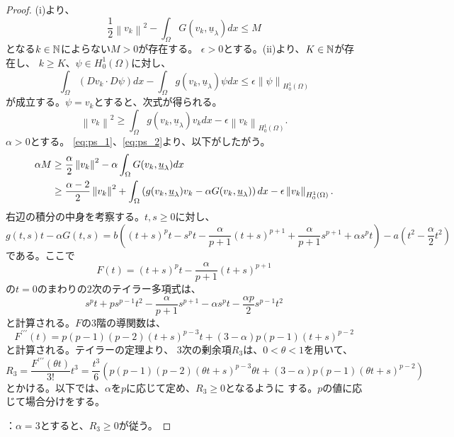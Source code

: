 \begin{proof}
 (i)より、
 \begin{equation}
  \frac{1}{2} \left\| v_k \right\|^2 - \int_\Omega G(v_k,
   \underline{u}_\lambda )dx \leq M \label{eq:ps_1}
 \end{equation}
 となる$k \in \mathbb{N}$によらない$M > 0$が存在する。
 $\epsilon > 0$とする。(ii)より、$K \in \mathbb{N}$が存在し、
 $k \geq K$、$\psi \in H_0^1(\Omega)$に対し、
 \[
  \int_\Omega (D v_k \cdot D \psi) dx - \int_\Omega g(v_k,
 \underline{u}_\lambda)\psi dx \leq \epsilon \left\| \psi
 \right\|_{H_0^1(\Omega) }
 \]
 が成立する。$\psi = v_k$とすると、次式が得られる。
 \begin{equation}
  \left\| v_k \right\|^2 \geq \int_\Omega g(v_k,
   \underline{u}_\lambda)v_k dx - \epsilon \left\| v_k
   \right\|_{H_0^1(\Omega)}. \label{eq:ps_2}
 \end{equation}
 $\alpha > 0$とする。
 \eqref{eq:ps_1}、\eqref{eq:ps_2}より、以下がしたがう。
 \begin{align}
  \alpha M &\geq  \frac{\alpha}{2} \left\| v_k \right\|^2 - \alpha
  \int_\Omega G(v_k, \underline{u}_\lambda) dx \notag \\
  & \geq \frac{\alpha-2}{2} \left\| v_k \right\|^2 + \int_\Omega 
  \left( g(v_k, \underline{u}_\lambda)v_k - \alpha G(v_k,
  \underline{u}_\lambda)  \right) dx - \epsilon \left\| v_k
  \right\|_{H^1_0(\Omega)}. \label{eq:alpha_M}
 \end{align}
 右辺の積分の中身を考察する。$t, s \geq 0$に対し、
 \[
   g(t, s)t - \alpha G(t, s)
  = b \left( (t+s)^p t - s^p t - \frac{\alpha}{p+1}(t+s)^{p+1} +
  \frac{\alpha}{p+1}s^{p+1} + \alpha s^p t \right) - a \left( t^2 -
  \frac{\alpha}{2} t^2 \right)
 \]
 である。ここで
 \[
  F(t) = (t+s)^p t - \frac{\alpha}{p+1}(t+s)^{p+1}
 \]
 の$t = 0$のまわりの$2$次のテイラー多項式は、
 \[
 s^pt + ps^{p-1} t^2 - \frac{\alpha}{p+1} s^{p+1} - \alpha s^p t -
 \frac{\alpha p}{2} s^{p-1} t^2 
 \]
 と計算される。$F$の$3$階の導関数は、
 \[
  F^{\prime\prime\prime}(t) = p(p-1)(p-2)(t+s)^{p-3} t + (3 - \alpha)
 p(p-1) (t+s)^{p-2}
 \]
 と計算される。テイラーの定理より、
 $3$次の剰余項$R_3$は、$0 < \theta < 1$を用いて、
 \[
  R_3 = \frac{F^{\prime\prime\prime}(\theta t)}{3!}t^3 = \frac{t^3}{6}
 \left( p(p-1)(p-2)(\theta t + s)^{p-3} \theta t + (3-\alpha) p(p-1)
 (\theta t + s)^{p-2} \right)
 \]
 とかける。以下では、$\alpha$を$p$に応じて定め、$R_3 \geq 0$となるように
 する。$p$の値に応じて場合分けをする。

 ：$\alpha = 3$とすると、$R_3 \geq 0$が従う。


\end{proof}
